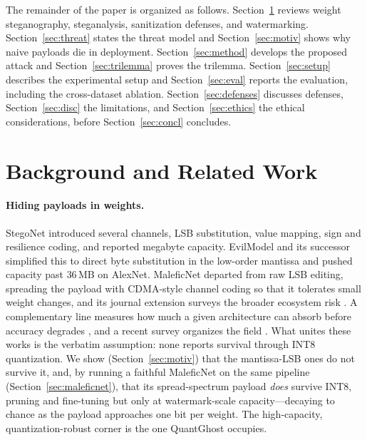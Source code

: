 \documentclass[10pt,journal]{IEEEtran}
\theoremstyle{remark}
\newcommand{\sys}{\mbox{QuantGhost}}
\begin{document}
The remainder of the paper is organized as follows. Section~\ref{sec:related} reviews
weight steganography, steganalysis, sanitization defenses, and watermarking.
Section~\ref{sec:threat} states the threat model and Section~\ref{sec:motiv} shows why
naive payloads die in deployment. Section~\ref{sec:method} develops the proposed attack
and Section~\ref{sec:trilemma} proves the trilemma. Section~\ref{sec:setup} describes
the experimental setup and Section~\ref{sec:eval} reports the evaluation, including the
cross-dataset ablation. Section~\ref{sec:defenses} discusses defenses,
Section~\ref{sec:disc} the limitations, and Section~\ref{sec:ethics} the ethical
considerations, before Section~\ref{sec:concl} concludes.

\section{Background and Related Work}\label{sec:related}
\paragraph{Hiding payloads in weights.} StegoNet \cite{liu2020stegonet} introduced
several channels, LSB substitution, value mapping, sign and resilience coding,
and reported megabyte capacity. EvilModel \cite{wang2021evilmodel} and its successor
\cite{wang2022evilmodel2} simplified this to direct byte substitution in the
low-order mantissa and pushed capacity past $36$\,MB on AlexNet. MaleficNet
\cite{hitaj2022maleficnet} departed from raw LSB editing, spreading the payload with
CDMA-style channel coding so that it tolerates small weight changes, and its journal
extension surveys the broader ecosystem risk \cite{hitaj2025trust}. A complementary
line measures how much a given architecture can absorb before accuracy degrades
\cite{agrawal2023stegcapacity,zhang2023stegcapacity}, and a recent survey organizes
the field \cite{chaganti2021stegomalware}. What unites these works is the verbatim
assumption: none reports survival through INT8 quantization. We show
(Section~\ref{sec:motiv}) that the mantissa-LSB ones do not survive it, and, by running a
faithful MaleficNet on the same pipeline (Section~\ref{sec:maleficnet}), that its
spread-spectrum payload \emph{does} survive INT8, pruning and fine-tuning but only at
watermark-scale capacity---decaying to chance as the payload approaches one bit per weight.
The high-capacity, quantization-robust corner is the one \sys{} occupies.
\end{document}
